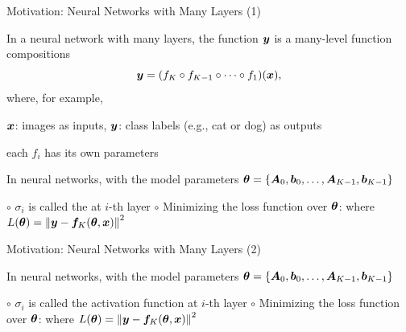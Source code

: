 \documentclass[handout,fleqn,aspectratio=169]{beamer}
\begin{document}
\begin{frame}{Motivation: Neural Networks with Many Layers (1)}

\plitemsep 0.01in

\bci 
\item In a neural network with many layers, the function $\bm{y}$ is a many-level function compositions
$$
\bm{y} = (f_K \circ f_{K-1} \circ \cdots \circ f_1)(\bm{x}),
$$
where, for example,  
\bci
\item $\bm{x}$: images as inputs, $\bm{y}$: class labels (e.g., cat or dog) as outputs
\item each $f_i$ has its own parameters
\eci

\item In neural networks, with the model parameters $\bm{\theta} = \{\bm{A}_0, \bm{b}_0, \ldots, \bm{A}_{K-1}, \bm{b}_{K-1} \}$

\smallskip
{}
{
\small
\vspace{-0.4cm}
$\circ$ $\sigma_i$ is called the  at $i$-th layer
}
{
\hspace{-0.7cm} $\circ$ Minimizing the loss function over $\bm{\theta}$:
where 
$
L(\bm{\theta}) = \left \lVert \bm{y} - \bm{f}_K(\bm{\theta},\bm{x}) \right \rVert^2
$
}

\eci
\end{frame}

\begin{frame}{Motivation: Neural Networks with Many Layers (2)}

\plitemsep 0.01in

\bci 

\item In neural networks, with the model parameters $\bm{\theta} = \{\bm{A}_0, \bm{b}_0, \ldots, \bm{A}_{K-1}, \bm{b}_{K-1} \}$

\smallskip
{}
{
\small
\vspace{-0.4cm}
$\circ$ $\sigma_i$ is called the activation function at $i$-th layer
}
{
\hspace{-0.7cm} $\circ$ Minimizing the loss function over $\bm{\theta}$:
where 
$
L(\bm{\theta}) = \left \lVert \bm{y} - \bm{f}_K(\bm{\theta},\bm{x}) \right \rVert^2
$
}

\medskip
\item \question {}

\eci
\end{frame}
\end{document}

